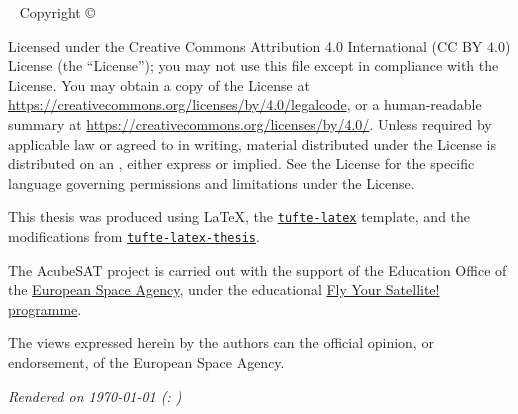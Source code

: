 \documentclass[a4paper,nobib]{tufte-book}
\begin{document}
\makeatother
\maketitle

\newpage
\begin{fullwidth}
~\vfill
\thispagestyle{empty}
\setlength{\parindent}{0pt}
\setlength{\parskip}{\baselineskip}
Copyright \copyright\ \the\year\ \thanklessauthor

\par{}

\par{}

\justify

\par Licensed under the Creative Commons Attribution 4.0 International (CC BY 4.0) License (the ``License''); you may not
use this file except in compliance with the License. You may obtain a copy
of the License at \url{https://creativecommons.org/licenses/by/4.0/legalcode}, or a human-readable summary at \url{https://creativecommons.org/licenses/by/4.0/}.
Unless
required by applicable law or agreed to in writing, material distributed
under the License is distributed on an , either express or implied. See the
License for the specific language governing permissions and limitations
under the License.

\par This thesis was produced using \LaTeX, the \href{https://ctan.org/pkg/tufte-latex?lang=en}{\texttt{tufte-latex}} template, and the modifications from \linebreak[4] \href{https://github.com/lalider/tufte-latex-thesis}{\texttt{tufte-latex-thesis}}.

\par The AcubeSAT project is carried out with the support of the Education Office of the \href{https://www.esa.int/}{European Space Agency}, under the educational \href{https://www.esa.int/Education/CubeSats_-_Fly_Your_Satellite/}{Fly Your Satellite! programme}.

\par The views expressed herein by the authors can  the official opinion, or endorsement, of the European Space Agency.

\par\textit{Rendered on \today{} (\texttt{\gitcommit}: \gitcommitmessage)}
\end{fullwidth}
\end{document}
